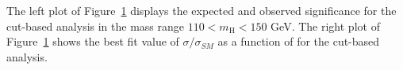 The left plot of Figure~\ref{fig:uls} displays the expected and observed significance
for the cut-based analysis in the mass range $110<\ensuremath{m_{\mathrm{H}}}<150$ GeV. 
The right plot of Figure~\ref{fig:uls} shows the best fit value of $\sigma/\sigma_{SM}$
as a function of \mHi for the cut-based analysis.

\begin{figure}[!hbtp]
\centering
{}
\label{fig:uls}
\end{figure}